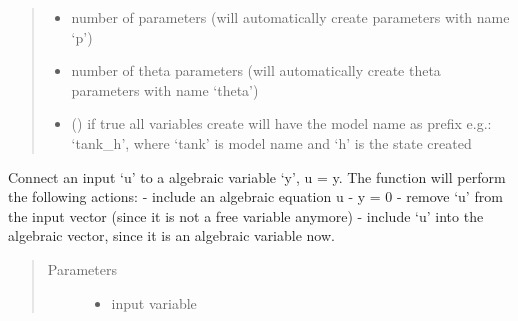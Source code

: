 \documentclass[letterpaper,10pt,english]{sphinxmanual}
\begin{document}
\begin{fulllineitems}
\begin{fulllineitems}
\begin{quote}
\begin{description}
\begin{itemize}
\item {} 
 \textendash{} number of parameters (will automatically create parameters with name ‘p’)

\item {} 
 \textendash{} number of theta parameters (will automatically create theta parameters with name ‘theta’)

\item {} 
 () \textendash{} if true all variables create will have the model name as prefix
e.g.: ‘tank\_h’, where ‘tank’ is model name and ‘h’ is the state created

\end{itemize}

\end{description}\end{quote}

\end{fulllineitems}


\begin{fulllineitems}
\label{\detokenize{yaocptool.modelling:yaocptool.modelling.system_model.SystemModel.all_sym}}
\end{fulllineitems}


\begin{fulllineitems}
\label{\detokenize{yaocptool.modelling:yaocptool.modelling.system_model.SystemModel.connect}}
Connect an input ‘u’ to a algebraic variable ‘y’, u = y.
The function will perform the following actions:
- include an algebraic equation u - y = 0
- remove ‘u’ from the input vector (since it is not a free variable anymore)
- include ‘u’ into the algebraic vector, since it is an algebraic variable now.
\begin{quote}\begin{description}
\item[{Parameters}] \leavevmode\begin{itemize}
\item {} 
 \textendash{} input variable


\end{itemize}
\end{description}
\end{quote}
\end{fulllineitems}
\end{fulllineitems}
\end{document}
